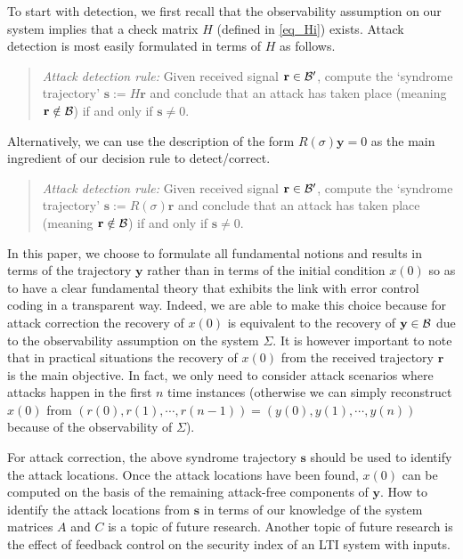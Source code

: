 \documentclass[letterpaper, 10 pt, conference]{ieeeconf}
\newcommand{\B}{{\cal B}}
\newcommand{\sbold}{\mathbf{s}}
\newcommand{\ybold}{\mathbf{y}}
\newcommand{\rbold}{\mathbf{r}}
\begin{document}
To start with detection, we first recall that the observability assumption on our system implies that a check matrix $H$ (defined in \eqref{eq_Hi}) exists. Attack detection is most easily formulated in terms of $H$ as follows.

\begin{quote} 
{\em Attack detection rule:} Given received signal $\rbold \in \B'$, compute the `syndrome trajectory' $\sbold := H \rbold $ and conclude that an attack has taken place (meaning $\rbold \notin \B$) if and only if $\sbold \neq 0$. 
\end{quote}

Alternatively, we can use the description of the form $R(\sigma ) \ybold =0$ as the main ingredient of our decision rule to detect/correct.   
\begin{quote}
{\em Attack detection rule:} Given received signal $\rbold \in \B'$, compute the `syndrome trajectory' $\sbold := R(\sigma )\rbold $ and conclude that an attack has taken place (meaning $\rbold \notin \B$) if and only if $\sbold \neq 0$. 
\end{quote}
In this paper, we choose to formulate all fundamental notions and results in terms of the trajectory $\ybold$ rather than in terms of the initial condition $x(0)$ so as to have a clear fundamental theory that exhibits the link with error control coding in a transparent way.  Indeed, we are able to make this choice because for attack correction the recovery of $x(0)$ is equivalent to the recovery of $\ybold \in \B$ due to the observability assumption on the system $\Sigma$. It is however important to note that in practical situations the recovery of $x(0)$ from the received trajectory $\rbold$ is the main objective. In fact, we only need to consider attack scenarios where attacks happen in the first $n$ time instances (otherwise we can simply reconstruct $x(0)$ from $(r(0) , r(1), \cdots , r(n-1))=(y(0) , y(1), \cdots , y(n))$ because of the observability of $\Sigma$).

For attack correction, the above syndrome trajectory $\sbold$ should be used to identify the attack locations.  Once the attack locations have been found, $x(0)$ can be computed on the basis of the remaining attack-free components of $\ybold$. How to identify the attack locations from $\sbold$ in terms of our knowledge of the system matrices $A$ and $C$ is a topic of future research. Another topic of future research is the effect of feedback control on the security index of an LTI system with inputs.




\addtolength{\textheight}{-12cm}   











\end{document}
